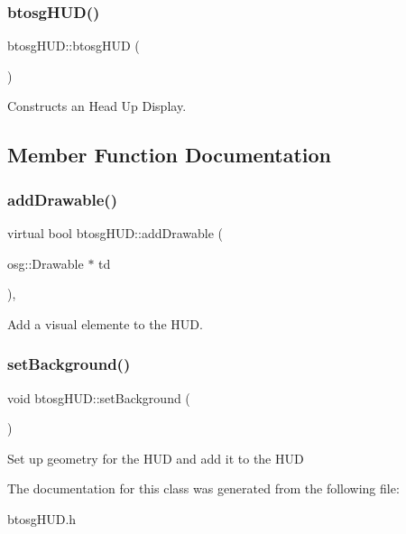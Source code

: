 \subsubsection{\texorpdfstring{btosg\+H\+U\+D()}{btosgHUD()}}
{\footnotesize\ttfamily btosg\+H\+U\+D\+::btosg\+H\+UD (\begin{DoxyParamCaption}{ }\end{DoxyParamCaption})\hspace{0.3cm}{\ttfamily [inline]}}

Constructs an Head Up Display. 

\subsection{Member Function Documentation}
\mbox{\label{classbtosgHUD_a182be3e4bdf00f9ff2b9c482833089a4}} 
\subsubsection{\texorpdfstring{add\+Drawable()}{addDrawable()}}
{\footnotesize\ttfamily virtual bool btosg\+H\+U\+D\+::add\+Drawable (\begin{DoxyParamCaption}\item[{osg\+::\+Drawable $\ast$}]{td }\end{DoxyParamCaption})\hspace{0.3cm}{\ttfamily [inline]}, {\ttfamily [virtual]}}

Add a visual elemente to the H\+UD. \mbox{\label{classbtosgHUD_a18c1eb80934574e6bdabbbee43e0bfeb}} 
\subsubsection{\texorpdfstring{set\+Background()}{setBackground()}}
{\footnotesize\ttfamily void btosg\+H\+U\+D\+::set\+Background (\begin{DoxyParamCaption}{ }\end{DoxyParamCaption})\hspace{0.3cm}{\ttfamily [inline]}}

Set up geometry for the H\+UD and add it to the H\+UD 

The documentation for this class was generated from the following file\+:\begin{DoxyCompactItemize}
\item 
btosg\+H\+U\+D.\+h\end{DoxyCompactItemize}
